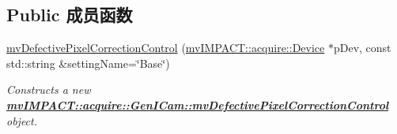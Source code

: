 \subsection*{Public 成员函数}
\begin{DoxyCompactItemize}
\item 
\hyperlink{classmv_i_m_p_a_c_t_1_1acquire_1_1_gen_i_cam_1_1mv_defective_pixel_correction_control_aae69ade3611d8ec28ff1074e0182404a}{mv\+Defective\+Pixel\+Correction\+Control} (\hyperlink{classmv_i_m_p_a_c_t_1_1acquire_1_1_device}{mv\+I\+M\+P\+A\+C\+T\+::acquire\+::\+Device} $\ast$p\+Dev, const std\+::string \&setting\+Name=\char`\"{}Base\char`\"{})
\begin{DoxyCompactList}\small\item\em Constructs a new {\bfseries \hyperlink{classmv_i_m_p_a_c_t_1_1acquire_1_1_gen_i_cam_1_1mv_defective_pixel_correction_control}{mv\+I\+M\+P\+A\+C\+T\+::acquire\+::\+Gen\+I\+Cam\+::mv\+Defective\+Pixel\+Correction\+Control}} object. \end{DoxyCompactList}\end{DoxyCompactItemize}
